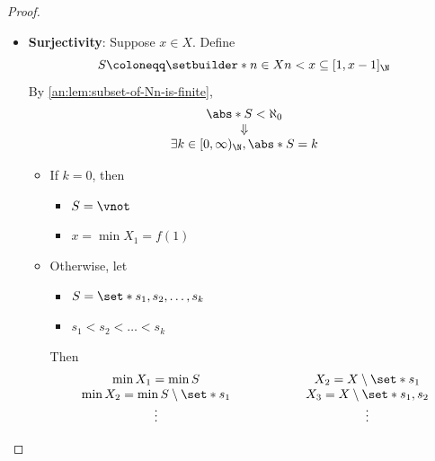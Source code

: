\begin{proof}
\begin{itemize}
\[            \begin{array}{c}
              X_{n_{2}} \subseteq X_{n_{1}} \setminus \set*{f(n_{1})} \\
              \Downarrow                                              \\
              f(n_{2}) \neq f(n_{1})
            \end{array}
          \]
          Therefore,
          \[
            f: \N \hookrightarrow X
          \]
    \item \textbf{Surjectivity}: Suppose $x \in X$. Define
          \[
            S \coloneqq \setbuilder*{n \in X}{n < x} \subseteq [1, x - 1]_{\N}
          \]
          By \cref{an:lem:subset-of-Nn-is-finite},
          \[
            \begin{array}{c}
              \abs*{S} < \aleph_{0} \\
              \Downarrow            \\
              \exists k \in [0, \infty)_{\N}, \abs*{S} = k
            \end{array}
          \]
          \begin{itemize}
            \item If $k = 0$, then
                  \begin{itemize}
                    \item $S = \vnot$
                    \item $x = \min X_{1} = f(1)$
                  \end{itemize}
            \item Otherwise, let
                  \begin{itemize}
                    \item $S = \set*{s_{1}, s_{2}, \dots, s_{k}}$
                    \item $s_{1} < s_{2} < \dots < s_{k}$
                  \end{itemize}
                  Then
                  \[
                    \begin{array}{c@{\qquad\qquad\qquad}c}
                      \min X_{1} = \min S
                       & X_{2} = X \setminus \set*{s_{1}}        \\
                      \min X_{2} = \min S \setminus \set*{s_{1}}
                       & X_{3} = X \setminus \set*{s_{1}, s_{2}} \\
                      \vdots
                       & \vdots                                  \\

\end{array}\]
\end{itemize}
\end{itemize}
\end{proof}

